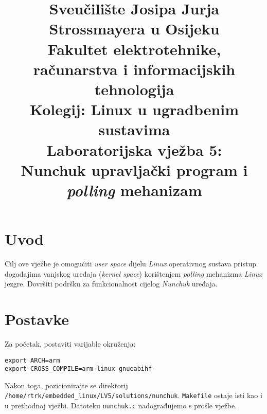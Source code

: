 \documentclass[11pt]{article}
\title{
	\Large Sveučilište Josipa Jurja Strossmayera u Osijeku \\
	Fakultet elektrotehnike, računarstva i informacijskih tehnologija \\
	\vspace{4cm}
	\Large Kolegij: Linux u ugradbenim sustavima \\
	\vspace{4cm}
	\Large \textbf{Laboratorijska vježba 5:\\
	Nunchuk upravljački program i\\
	\textit{polling} mehanizam}
	}
\date{}
\begin{document}
\maketitle
\thispagestyle{empty}
\newpage

\section{Uvod}
Cilj ove vježbe je omogućiti \textit{user space} dijelu \textit{Linux}
operativnog sustava pristup događajima vanjskog uređaja (\textit{kernel space})
korištenjem \textit{polling} mehanizma \textit{Linux} jezgre. Dovršiti
podršku za funkcionalnost cijelog \textit{Nunchuk} uređaja.

\section{Postavke}
Za početak, postaviti varijable okruženja:
\begin{lstlisting}
export ARCH=arm
export CROSS_COMPILE=arm-linux-gnueabihf-
\end{lstlisting}
Nakon toga, pozicionirajte se direktorij
\texttt{/home/rtrk/embedded\_linux/LV5/solutions/nunchuk}. \texttt{Makefile}
ostaje isti kao i u prethodnoj vježbi. Datoteku \texttt{nunchuk.c} nadograđujemo
s prošle vježbe.
\end{document}
